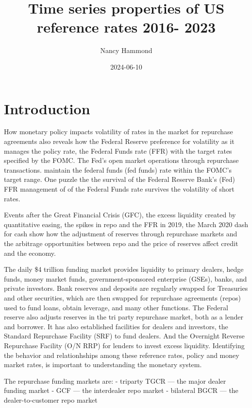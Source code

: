 \documentclass[
]{article}
\title{Time series properties of US reference rates 2016- 2023}
\author{Nancy Hammond}
\date{2024-06-10}
\begin{document}
\maketitle

{
\setcounter{tocdepth}{2}
\tableofcontents
}
\hypertarget{introduction}{%
\section{Introduction}\label{introduction}}

How monetary policy impacts volatility of rates in the market for repurchase agreements also reveals how the Federal Reserve preference for volatility as it manages the policy rate, the Federal Funds rate (FFR) with the target rates specified by the FOMC. The Fed's open market operations through repurchase transactions. maintain the federal funds (fed funds) rate within the FOMC's target range. One puzzle the the survival of the Federal Reserve Bank's (Fed) FFR management of of the Federal Funds rate survives the volatility of short rates.

Events after the Great Financial Crisis (GFC), the excess liquidity created by quantitative easing, the spikes in repo and the FFR in 2019, the March 2020 dash for cash show how the adjustment of reserves through repurchase markets and the arbitrage opportunities between repo and the price of reserves affect credit and the economy.

The daily \$4 trillion funding market provides liquidity to primary dealers, hedge funds, money market funds, government-sponsored enterprise (GSEs), banks, and private investors. Bank reserves and deposits are regularly swapped for Treasuries and other securities, which are then swapped for repurchase agreements (repos) used to fund loans, obtain leverage, and many other functions. The Federal reserve also adjusts reserves in the tri party repurchase market, both as a lender and borrower. It has also established facilities for dealers and investors, the Standard Repurchase Facility (SRF) to fund dealers. And the Overnight Reverse Repurchase Facility (O/N RRP) for lenders to invest excess liquidity. Identifying the behavior and relationhships among these reference rates, policy and money market rates, is important to understanding the monetary system.

The repurchase funding markets are:
- triparty TGCR --- the major dealer funding market
- GCF --- the interdealer repo market
- bilateral BGCR --- the dealer-to-customer repo market
\end{document}
